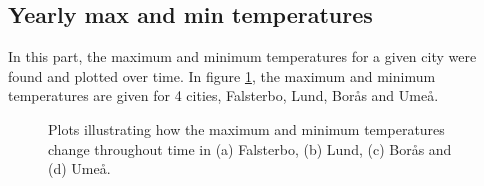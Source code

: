 \subsection{Yearly max and min temperatures}
In this part, the maximum and minimum temperatures for a given city were found and plotted over time. In figure \ref{fig:MinMaxTemp}, the maximum and minimum temperatures are given for 4 cities, Falsterbo, Lund, Borås and Umeå.
\begin{figure}[H]
    \centering
    \quad
    \caption{Plots illustrating how the maximum and minimum temperatures change throughout time in (a) Falsterbo, (b) Lund, (c) Borås and (d) Umeå.}
    \label{fig:MinMaxTemp}
\end{figure}
